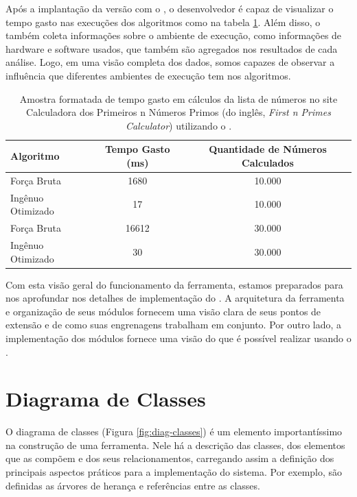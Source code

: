 \documentclass[12pt]{tcc}
\begin{document}
	Após a implantação da versão com o , o desenvolvedor é capaz de visualizar o tempo gasto nas execuções dos algoritmos como na tabela \ref{table:resultado-easyelc}.
	Além disso, o  também coleta informações sobre o ambiente de execução, como informações de hardware e software usados, que também são agregados nos resultados de cada análise.
	Logo, em uma visão completa dos dados, somos capazes de observar a influência que diferentes ambientes de execução tem nos algoritmos.

	\begin{table}[!h]
		\centering
		\caption{Amostra formatada de tempo gasto em cálculos da lista de números no site Calculadora dos Primeiros n Números Primos (do inglês, \emph{First n Primes Calculator}) utilizando o .}
		\begin{tabular}{lcc}
			\hline
			Algoritmo & Tempo Gasto (ms) & Quantidade de Números Calculados \\
			\hline
			Força Bruta & 1680 & 10.000 \\
			Ingênuo Otimizado & 17 & 10.000 \\
			Força Bruta & 16612 & 30.000 \\
			Ingênuo Otimizado & 30 & 30.000 \\
			\hline
		\end{tabular}
		\label{table:resultado-easyelc}
	\end{table}

	Com esta visão geral do funcionamento da ferramenta, estamos preparados para nos aprofundar nos detalhes de implementação do .
	A arquitetura da ferramenta e organização de seus módulos fornecem uma visão clara de seus pontos de extensão e de como suas engrenagens trabalham em conjunto.
	Por outro lado, a implementação dos módulos fornece uma visão do que é possível realizar usando o .


	\section{Diagrama de Classes}
	\label{sec:diagrama_de_classe}


	O diagrama de classes (Figura \ref{fig:diag-classes}) é um elemento importantíssimo na construção de uma ferramenta.
	Nele há a descrição das classes, dos elementos que as compõem e dos seus relacionamentos, carregando assim a definição dos principais aspectos práticos para a implementação do sistema.
	Por exemplo, são definidas as árvores de herança e referências entre as classes.
\end{document}
